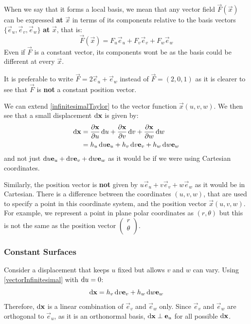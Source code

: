 \documentclass[../main.tex]{subfiles}
\begin{document}
When we say that it forms a local basis, we mean that any vector field $\vec{F}(\vec{x})$ can be expressed \textbf{at} $\vec{x}$ in terms of its components relative to the basis vectors $\{\vec{e}_u, \vec{e}_v, \vec{e}_w\}$ \textbf{at} $\vec{x}$, that is:
\[
  \vec{F}(\vec{x}) = F_u \vec{e}_u + F_v \vec{e}_v + F_w \vec{e}_w
\]
Even if $\vec{F}$ is a constant vector, its components wont be as the basis could be different at every $\vec{x}$.
\begin{remark}
  It is preferable to write $\vec{F} = 2 \vec{e}_u + \vec{e}_w$ instead of $\vec{F} = (2, 0, 1)$ as it is clearer to see that $\vec{F}$ is \textbf{not} a constant position vector.
\end{remark}

We can extend \cref{infinitesimalTaylor} to the vector function $\vec{x}(u, v, w)$.
We then see that a small displacement $\d{\vec{x}}$ is given by:
\begin{align}
  \d{\vec{x}} &= \pderiv{\vec{x}}{u} \d{u} + \pderiv{\vec{x}}{v} \d{v} + \pderiv{\vec{x}}{w} \d{w} \nonumber \\
              &= h_u \d{u} \vec{e}_u + h_v \d{v} \vec{e}_v + h_w \d{w} \vec{e}_w \label{vectorInfinitesimal}
\end{align}
and not just $\d{u} \vec{e}_u + \d{v} \vec{e}_v + \d{w} \vec{e}_w$ as it would be if we were using Cartesian coordinates.

Similarly, the position vector is \textbf{not} given by $u\vec{e}_u + v\vec{e}_v + w\vec{e}_w$ as it would be in Cartesian.
There is a difference between the coordinates $(u, v, w)$, that are used to specify a point in this coordinate system, and the position vector $\vec{x}(u, v, w)$.
For example, we represent a point in plane polar coordinates as $(r, \theta)$ but this is not the same as the position vector $
\left(\begin{smallmatrix}
r \\
\theta \\
\end{smallmatrix}\right)$.
\subsubsection{Constant Surfaces}
Consider a displacement that keeps $u$ fixed but allows $v$ and $w$ can vary.
Using \cref{vectorInfinitesimal} with $\d{u} = 0$:
\[
  \d{\vec{x}} = h_v \d{v} \vec{e}_v + h_w \d{w} \vec{e}_w
\]
Therefore, $\d{\vec{x}}$ is a linear combination of $\vec{e}_v$ and $\vec{e}_w$ only.
Since $\vec{e}_v$ and $\vec{e}_w$ are orthogonal to $\vec{e}_u$, as it is an orthonormal basis, $\d{\vec{x}} \perp \vec{e}_u$ for all possible $\d{\vec{x}}$.
\end{document}
